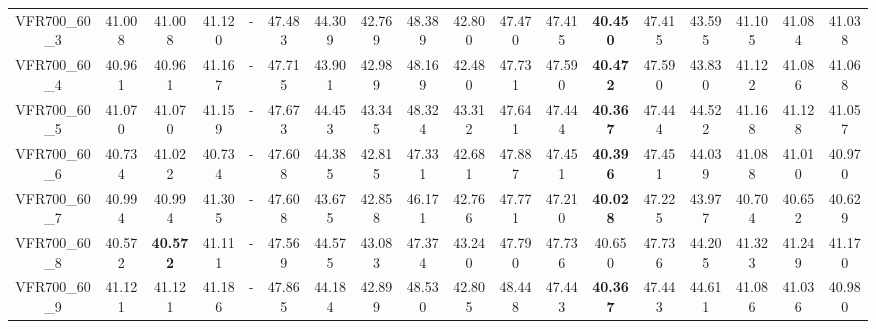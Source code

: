 \begin{tabular}{cc|ccc|ccccccccccccc}
VFR700\_60\_3      & 41.008           & 41.008           & 41.120           & -                & 47.483           & 44.309           & 42.769           & 48.389           & 42.800           & 47.470           & 47.415           & {\bf 40.450}     & 47.415           & 43.595           & 41.105           & 41.084           & 41.038          \\ 
VFR700\_60\_4      & 40.961           & 40.961           & 41.167           & -                & 47.715           & 43.901           & 42.989           & 48.169           & 42.480           & 47.731           & 47.590           & {\bf 40.472}     & 47.590           & 43.830           & 41.122           & 41.086           & 41.068          \\ 
VFR700\_60\_5      & 41.070           & 41.070           & 41.159           & -                & 47.673           & 44.453           & 43.345           & 48.324           & 43.312           & 47.641           & 47.444           & {\bf 40.367}     & 47.444           & 44.522           & 41.168           & 41.128           & 41.057          \\ 
VFR700\_60\_6      & 40.734           & 41.022           & 40.734           & -                & 47.608           & 44.385           & 42.815           & 47.331           & 42.681           & 47.887           & 47.451           & {\bf 40.396}     & 47.451           & 44.039           & 41.088           & 41.010           & 40.970          \\ 
VFR700\_60\_7      & 40.994           & 40.994           & 41.305           & -                & 47.608           & 43.675           & 42.858           & 46.171           & 42.766           & 47.771           & 47.210           & {\bf 40.028}     & 47.225           & 43.977           & 40.704           & 40.652           & 40.629          \\ 
VFR700\_60\_8      & 40.572           & {\bf 40.572}     & 41.111           & -                & 47.569           & 44.575           & 43.083           & 47.374           & 43.240           & 47.790           & 47.736           & 40.650           & 47.736           & 44.205           & 41.323           & 41.249           & 41.170          \\ 
VFR700\_60\_9      & 41.121           & 41.121           & 41.186           & -                & 47.865           & 44.184           & 42.899           & 48.530           & 42.805           & 48.448           & 47.443           & {\bf 40.367}     & 47.443           & 44.611           & 41.086           & 41.036           & 40.980          \\ 

\end{tabular}
